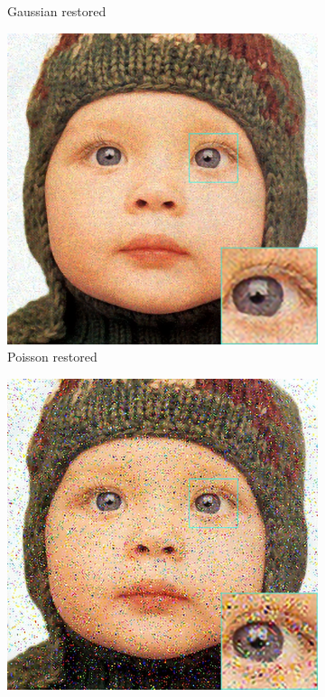 \begin{figure}
\begin{subfigure}{0.24\textwidth}
		\caption{Gaussian restored}
	\end{subfigure}
	\begin{subfigure}{0.24\textwidth}
		\includegraphics[width=\textwidth]{images/exp1.1/poisson.png}
		\caption{Poisson restored}
	\end{subfigure}
	\begin{subfigure}{0.24\textwidth}
		\includegraphics[width=\textwidth]{images/exp1.1/salt.png}

\end{subfigure}
\end{figure}
